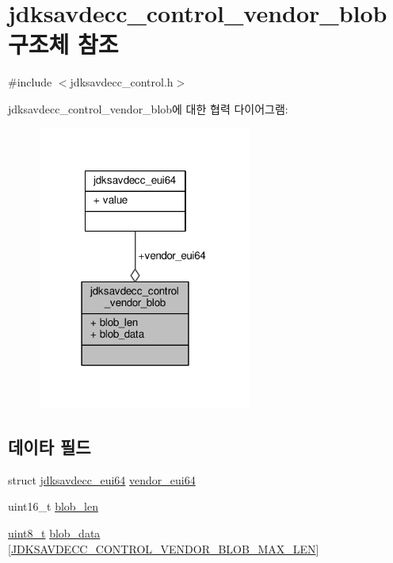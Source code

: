 \hypertarget{structjdksavdecc__control__vendor__blob}{}\section{jdksavdecc\+\_\+control\+\_\+vendor\+\_\+blob 구조체 참조}
\label{structjdksavdecc__control__vendor__blob}


{\ttfamily \#include $<$jdksavdecc\+\_\+control.\+h$>$}



jdksavdecc\+\_\+control\+\_\+vendor\+\_\+blob에 대한 협력 다이어그램\+:
\nopagebreak
\begin{figure}[H]
\begin{center}
\leavevmode
\includegraphics[width=198pt]{structjdksavdecc__control__vendor__blob__coll__graph}
\end{center}
\end{figure}
\subsection*{데이타 필드}
\begin{DoxyCompactItemize}
\item 
struct \hyperlink{structjdksavdecc__eui64}{jdksavdecc\+\_\+eui64} \hyperlink{structjdksavdecc__control__vendor__blob_a6183c85748a8af0003d293d653c4ae9b}{vendor\+\_\+eui64}
\item 
uint16\+\_\+t \hyperlink{structjdksavdecc__control__vendor__blob_acd6dc9e8eefce390d68c067f3466096c}{blob\+\_\+len}
\item 
\hyperlink{stdint_8h_aba7bc1797add20fe3efdf37ced1182c5}{uint8\+\_\+t} \hyperlink{structjdksavdecc__control__vendor__blob_a0c0251f093c4c98d2f19e9e337e8cf67}{blob\+\_\+data} \mbox{[}\hyperlink{group__aem__control__value__helpers_ga57e56d1bcf3f14adaa62ca1b9204bbe2}{J\+D\+K\+S\+A\+V\+D\+E\+C\+C\+\_\+\+C\+O\+N\+T\+R\+O\+L\+\_\+\+V\+E\+N\+D\+O\+R\+\_\+\+B\+L\+O\+B\+\_\+\+M\+A\+X\+\_\+\+L\+EN}\mbox{]}
\end{DoxyCompactItemize}


